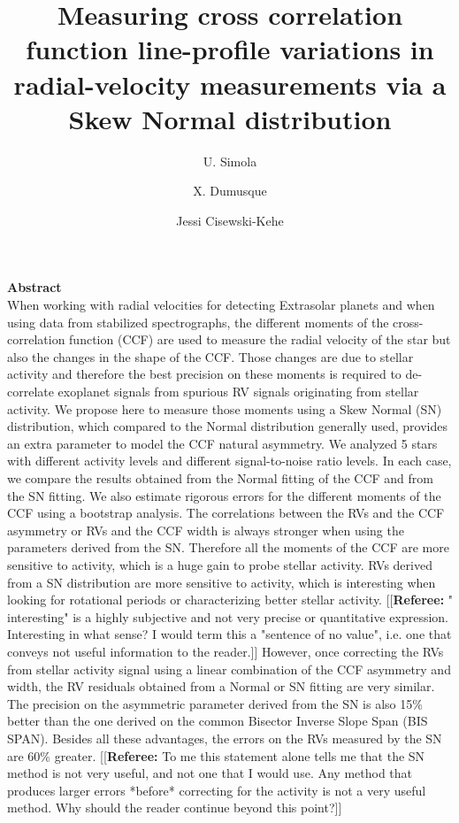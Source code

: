 \documentclass[11pt, oneside]{article}
\title{Measuring cross correlation function line-profile variations in radial-velocity measurements via a Skew Normal distribution}
\author{U. Simola
	    \and X. Dumusque
	    \and Jessi Cisewski-Kehe
	    }
\newcommand{\comment}[1]{{\color{red}[[\textbf{Referee: }#1]]}}
\begin{document}
\maketitle

{\bf Abstract}\\
When working with radial velocities for detecting Extrasolar planets and when using data from stabilized spectrographs,
the different moments of the cross-correlation function (CCF) are used to measure the radial velocity of the star but also the changes in the shape of the CCF. Those changes are due to stellar activity and therefore the best precision on these moments is required to de-correlate exoplanet signals from spurious RV signals originating from stellar activity.
We propose here to measure those moments using a Skew Normal (SN) distribution, which compared to the Normal distribution generally used, provides an extra parameter to model the CCF natural asymmetry.
We analyzed 5 stars with different activity levels and different signal-to-noise ratio levels. In each case, we compare the results obtained from the Normal fitting of the CCF and from the SN fitting. We also estimate rigorous errors for the different moments of the CCF using a bootstrap analysis.
The correlations between the RVs and the CCF asymmetry or RVs and the CCF width is always stronger when using the parameters derived from the SN. Therefore all the moments of the CCF are more sensitive to activity, which is a huge gain to probe stellar activity. RVs derived from a SN distribution are more sensitive to activity, which is interesting when looking for rotational periods or characterizing better stellar activity. 
\comment{" interesting" is a highly subjective and not very precise or quantitative expression. Interesting in what sense? I would term this a "sentence of no value", i.e. one that conveys not useful information to the reader.}
However, once correcting the RVs from stellar activity signal using a linear combination of the CCF asymmetry and width, the RV residuals obtained from a Normal or SN fitting are very similar. The precision on the asymmetric parameter derived from the SN is also 15\% better than the one derived on the common Bisector Inverse Slope Span (BIS SPAN). Besides all these advantages, the errors on the RVs measured by the SN are 60\% greater. 
\comment{To me this statement alone tells me that the SN method is not very useful, and not one that I would use. Any method that produces larger errors *before* correcting for the activity is not a very useful method. Why should the reader continue beyond this point?}
\end{document}
